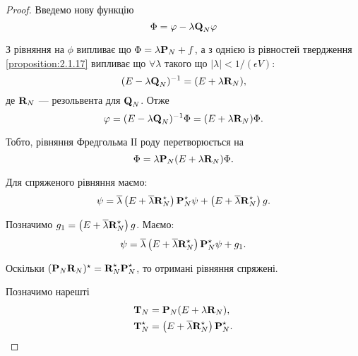 \begin{proof}
	Введемо нову функцію 
	\begin{equation}
		\Phi = \phi - \lambda \bf{Q}_N \phi
	\end{equation}

	З рівняння на $\phi$ випливає що $\Phi = \lambda \bf{P}_N + f$, а з однією із рівностей твердження \ref{proposition:2.1.17} випливає що $\forall \lambda$ такого що $|\lambda| < 1 / (\epsilon V)$:
	\begin{equation}
		(E - \lambda \bf{Q}_N)^{-1} = (E + \lambda \bf{R}_N),
	\end{equation}
	де $\bf{R}_N$ --- резольвента для $\bf{Q}_N$. Отже
	\begin{equation}
		\phi = (E - \lambda \bf{Q}_N)^{-1} \Phi = (E + \lambda \bf{R}_N) \Phi.
	\end{equation}

	Тобто, рівняння Фредгольма ІІ роду перетворюється на 
	\begin{equation}
		\Phi = \lambda \bf{P}_N (E + \lambda \bf{R}_N) \Phi.
	\end{equation}

	Для спряженого рівняння маємо:
	\begin{equation}
		\psi = \overline \lambda \left(E + \overline \lambda \bf{R}_N^\star\right) \bf{P}_N^\star  \psi + \left(E + \overline \lambda \bf{R}_N^\star\right) g.
	\end{equation}

	Позначимо $g_1 = \left(E + \overline \lambda \bf{R}_N^\star\right) g$. Маємо:
	\begin{equation}
		\psi = \overline \lambda \left(E + \overline \lambda \bf{R}_N^\star\right) \bf{P}_N^\star  \psi + g_1.
	\end{equation}

	Оскільки $(\bf{P}_N \bf{R}_N)^\star  = \bf{R}_N^\star  \bf{P}_N^\star $, то отримані рівняння спряжені. \medskip

	Позначимо нарешті
	\begin{align}
		\bf{T}_N &= \bf{P}_N (E + \lambda \bf{R}_N), \\
		\bf{T}_N^\star &= \left(E + \overline \lambda \bf{R}_N^\star\right) \bf{P}_N^\star.
	\end{align}


\end{proof}
